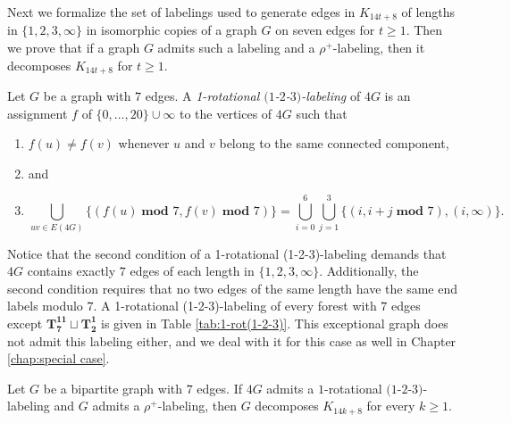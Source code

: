 Next we formalize the set of labelings used to generate edges in $K_{14t+8}$ of lengths in $\{1,2,3,\infty\}$ in isomorphic copies of a graph $G$ on seven edges for $t\geq 1$. Then we prove that if a graph $G$ admits such a labeling and a $\rho^{+}$-labeling, then it decomposes $K_{14t+8}$ for $t\geq 1$.

\begin{definition}\label{def:1-2-3-1-rot}
    Let $G$ be a graph with $7$ edges. A \emph{1-rotational $(1$-$2$-$3)$-labeling} of $4G$ is an assignment $f$ of $\{0,\dots,20\} \cup \infty$ to the vertices of $4G$ such that
    \begin{enumerate}
        \item $f(u) \neq f(v)$ whenever $u$ and $v$ belong to the same connected component, 
        \item[] and
        \item  $$ \bigcup_{uv\in E(4G)} \{(f(u)\; \textbf{mod } 7,f(v)\; \textbf{mod } 7)\}= \bigcup_{i=0}^{6} \bigcup_{j=1}^{3} \{(i,i+j \; \textbf{mod } 7), (i,\infty)\}.$$
    \end{enumerate}
\end{definition}
Notice that the second condition of a 1-rotational (1-2-3)-labeling demands that $4G$ contains exactly $7$ edges of each length in $\{1,2,3,\infty\}$. Additionally, the second condition requires that no two edges of the same length have the same end labels modulo $7$. A 1-rotational (1-2-3)-labeling of every forest with $7$ edges except $\mathbf{T_{7}^{11}}\sqcup\mathbf{T_{2}^{1}}$ is given in Table \ref{tab:1-rot(1-2-3)}. This exceptional graph does not admit this labeling either, and we deal with it for this case as well in Chapter \ref{chap:special case}.

\begin{thm}\label{thm:1-2-3 1-rot plus rho}
    Let $G$ be a bipartite graph with $7$ edges. If $4G$ admits a $1$-rotational  $(1$-$2$-$3)$-labeling and $G$ admits a $\rho^{+}$-labeling, then $G$ decomposes $K_{14k+8}$ for every $k\geq1.$
\end{thm}


